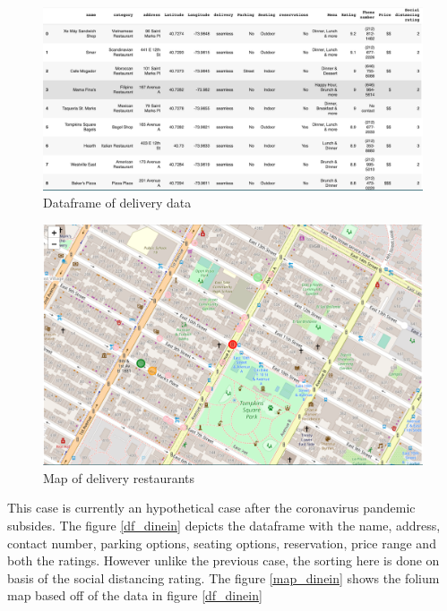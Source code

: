 \documentclass[11pt]{report}
\begin{document}
\begin{figure}[ht]
  \includegraphics[width =\columnwidth]{east-village-delivery-data.png}
  \caption{Dataframe of delivery data}
  \label{df_delivery}
\end{figure}

\begin{figure}[ht]
  \includegraphics[width =\columnwidth]{east-village-delivery.png}
  \caption{Map of delivery restaurants}
  \label{map_delivery}
\end{figure}

\par This case is currently an hypothetical case after the coronavirus pandemic subsides. The figure \ref{df_dinein} depicts the dataframe with the name, address, contact number, parking options, seating options, reservation, price range and both the ratings. However unlike the previous case, the sorting here is done on basis of the social distancing rating. The figure \ref{map_dinein} shows the folium map based off of the data in figure \ref{df_dinein} 
\end{document}
